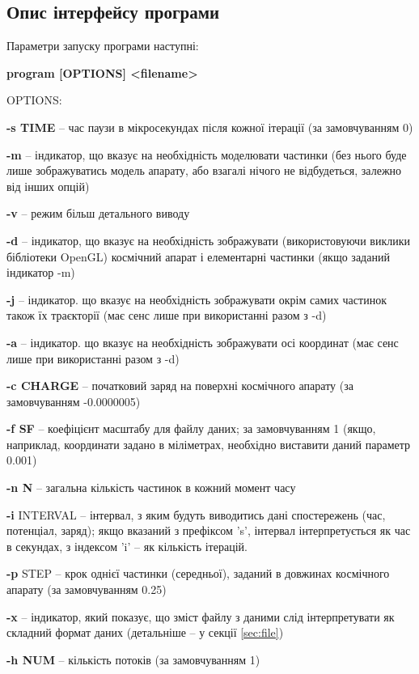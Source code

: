 \documentclass[a4paper,12pt]{article}
\begin{document}
\subsection{Опис інтерфейсу програми}
Параметри запуску програми наступні:

\textbf{program [OPTIONS] <filename>}
    
    OPTIONS:
    
    \textbf{-s TIME} -- час паузи в мікросекундах після кожної ітерації (за замовчуванням 0)
    
    \textbf{-m} -- індикатор, що вказує на необхідність моделювати частинки (без нього буде лише зображуватись модель апарату, або взагалі нічого не відбудеться, залежно від інших опцій)
    
    \textbf{-v} -- режим більш детального виводу
    
    \textbf{-d} -- індикатор, що вказує на необхідність зображувати (використовуючи виклики бібліотеки OpenGL) космічний апарат і елементарні частинки (якщо заданий індикатор -m)
    
    \textbf{-j} -- індикатор. що вказує на необхідність зображувати окрім самих частинок також їх траєкторії (має сенс лише при використанні разом з -d)
    
    \textbf{-a} -- індикатор. що вказує на необхідність зображувати осі координат (має сенс лише при використанні разом з -d)
    
    \textbf{-c CHARGE} -- початковий заряд на поверхні космічного апарату (за замовчуванням -0.0000005)
    
    \textbf{-f SF} -- коефіцієнт масштабу для файлу даних; за замовчуванням 1 (якщо, наприклад, координати задано в міліметрах, необхідно виставити даний параметр 0.001)
    
    \textbf{-n N } -- загальна кількість частинок в кожний момент часу
    
    \textbf{-i} INTERVAL -- інтервал, з яким будуть виводитись дані спостережень (час, потенціал, заряд); якщо вказаний з префіксом 's', інтервал інтерпретується як час в секундах, з індексом 'i' -- як кількість ітерацій.
    
    \textbf{-p} STEP -- крок однієї частинки (середньої), заданий в довжинах космічного апарату (за замовчуванням 0.25)
    
    \textbf{-x} -- індикатор, який показує, що зміст файлу з даними слід інтерпретувати як складний формат даних (детальніше -- у секції \ref{sec:file})
    
    \textbf{-h NUM} -- кількість потоків (за замовчуванням 1)
    
\end{document}
